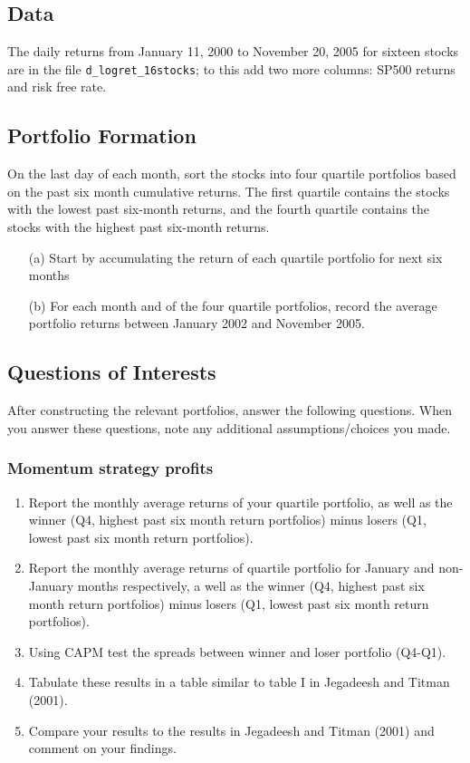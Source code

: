 \documentclass[11pt]{article}
\begin{document}
\subsection{Data}
The daily returns from January 11, 2000 to November 20, 2005 for sixteen stocks are in the file \verb|d_logret_16stocks|; to this add two more columns: SP500 returns and risk free rate. 
\subsection{Portfolio Formation}
On the last day of each month, sort the stocks into four quartile portfolios based on the past six month cumulative returns. The first quartile contains the stocks with the lowest past six-month returns, and the fourth quartile contains the stocks with the highest past six-month returns.
\begin{enumerate}
\item[(a)] Start by accumulating the return of each quartile portfolio for next six months
\item[(b)] For each month and of the four quartile portfolios, record the average portfolio returns between January 2002 and November 2005.
\end{enumerate}
\subsection{Questions of Interests}
After constructing the relevant portfolios, answer the following questions. When you answer these questions, note any additional assumptions/choices you made.
\subsubsection{Momentum strategy profits}
\begin{enumerate}
\item Report the monthly average returns of your quartile portfolio, as well as the winner (Q4, highest past six month return portfolios) minus losers (Q1, lowest past six month return portfolios).
\item Report the monthly average returns of quartile portfolio for January and non-January months respectively, a well as the winner (Q4, highest past six month return portfolios) minus losers (Q1, lowest past six month return portfolios). 
\item Using CAPM test the spreads between winner and loser portfolio (Q4-Q1). 
\item Tabulate these results in a table similar to table I in Jegadeesh and Titman (2001).
\item Compare  your results to the results in Jegadeesh and Titman (2001) and comment on your findings.
\end{enumerate}
\end{document}
